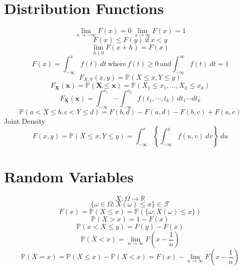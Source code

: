 \documentclass[twocolumn]{amsart}
\renewcommand{\P}{\mathbb{P}}
\begin{document}
\section*{Distribution Functions}
\begin{equation*}
  \lim_{x\to-\infty}F(x)=0~\lim_{x\to\infty}F(x)=1
\end{equation*}
\begin{equation*}
  F(x) \leq F(y)~\text{if}~x<y
\end{equation*}
\begin{equation*}
  \lim_{h \downarrow 0}F(x+h)=F(x)
\end{equation*}
\begin{equation*}
  F(x)=\int_{-\infty}^{x}f(t)~dt~\text{where}~f(t)\geq
  0~\text{and}\int_{-\infty}^{\infty}f(t)~dt = 1
\end{equation*}
\begin{equation*}
  F_{X,Y}(x,y)=\P(X\leq x,Y\leq y)
\end{equation*}
\begin{equation*}
  F_{\boldsymbol{X}}(\boldsymbol{x})=\P(\boldsymbol{X}\leq\boldsymbol{x}) =
  \P(X_{1}\leq x_{1},\ldots,X_{k}\leq x_{k})
\end{equation*}
\begin{equation*}
  F_{\boldsymbol{X}}(\boldsymbol{x})=\int_{-\infty}^{x_{1}}\dotsi
  \int_{-\infty}^{x_{k}}f(t_{1},\cdots,t_{k})~dt_{1}\dotsm dt_{k}
\end{equation*}
\begin{equation*}
  \P(a < X \leq b, c < Y \leq d) = F(b,d) - F(a,d) - F(b,c) + F(a,c)
\end{equation*}
Joint Density
\begin{equation*}
  F(x,y) = \P(X \leq x,Y \leq y) = \int_{-\infty}^{x}\left\{ \int_{-\infty}^{y}
    f(u,v)~dv\right\}~du
\end{equation*}

\section*{Random Variables}
\begin{equation*}
  X: \Omega \rightarrow \mathbb{R}
\end{equation*}
\begin{equation*}
  \{\omega \in \Omega : X(\omega) \leq x\} \in \mathcal{F}
\end{equation*}
\begin{equation*}
  F(x) = \P(X \leq x) = \P(\{\omega : X(\omega) \leq x\})
\end{equation*}
\begin{equation*}
  \P(X>x) = 1-F(x)
\end{equation*}
\begin{equation*}
  \P(x<X\leq y) = F(y) - F(x)
\end{equation*}
\begin{equation*}
  \P(X<x) = \lim_{n\to \infty}F(x - \frac{1}{n})
\end{equation*}
\begin{equation*}
  \P(X=x) = \P(X\leq x) - \P(X < x) = F(x)-\lim_{n\to \infty}F(x-\frac{1}{n})
\end{equation*}
\end{document}
